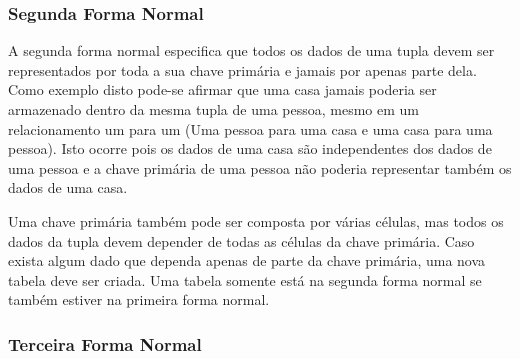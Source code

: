     
\subsubsection{Segunda Forma Normal}
    
A segunda forma normal especifica que todos os dados de uma tupla devem ser representados por toda a sua chave primária e jamais por apenas parte dela. Como exemplo disto pode-se afirmar que uma casa jamais poderia ser armazenado dentro da mesma tupla de uma pessoa, mesmo em um relacionamento um para um (Uma pessoa para uma casa e uma casa para uma pessoa). Isto ocorre pois os dados de uma casa são independentes dos dados de uma pessoa e a chave primária de uma pessoa não poderia representar também os dados de uma casa.
    
Uma chave primária também pode ser composta por várias células, mas todos os dados da tupla devem depender de todas as células da chave primária. Caso exista algum dado que dependa apenas de parte da chave primária, uma nova tabela deve ser criada. Uma tabela somente está na segunda forma normal se também estiver na primeira forma normal.
    
\subsubsection{Terceira Forma Normal}
    
